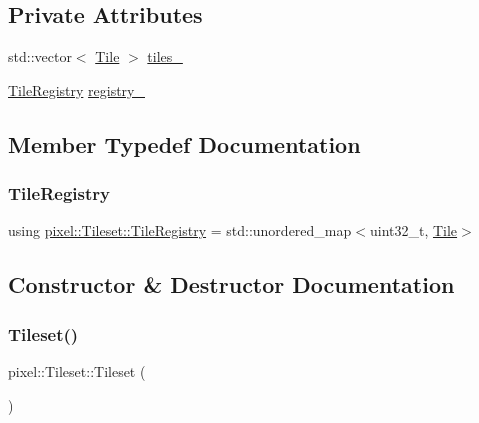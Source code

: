 \subsection*{Private Attributes}
\begin{DoxyCompactItemize}
\item 
std\+::vector$<$ \hyperlink{structpixel_1_1_tileset_1_1_tile}{Tile} $>$ \hyperlink{classpixel_1_1_tileset_a3037828f512098ac7c6637ceb4819181}{tiles\+\_\+}
\item 
\hyperlink{classpixel_1_1_tileset_a07353350c368c82275a5f821b0b2ee94}{Tile\+Registry} \hyperlink{classpixel_1_1_tileset_ae1ead42caea0c607c07975e354fc4c1c}{registry\+\_\+}
\end{DoxyCompactItemize}


\subsection{Member Typedef Documentation}
\mbox{\label{classpixel_1_1_tileset_a07353350c368c82275a5f821b0b2ee94}} 
\subsubsection{\texorpdfstring{Tile\+Registry}{TileRegistry}}
{\footnotesize\ttfamily using \hyperlink{classpixel_1_1_tileset_a07353350c368c82275a5f821b0b2ee94}{pixel\+::\+Tileset\+::\+Tile\+Registry} =  std\+::unordered\+\_\+map$<$uint32\+\_\+t, \hyperlink{structpixel_1_1_tileset_1_1_tile}{Tile}$>$}



\subsection{Constructor \& Destructor Documentation}
\mbox{\label{classpixel_1_1_tileset_a4ba3df1394c0dbf5f2d1ab38545d5bcc}} 
\subsubsection{\texorpdfstring{Tileset()}{Tileset()}}
{\footnotesize\ttfamily pixel\+::\+Tileset\+::\+Tileset (\begin{DoxyParamCaption}{ }\end{DoxyParamCaption})\hspace{0.3cm}{\ttfamily [default]}}



